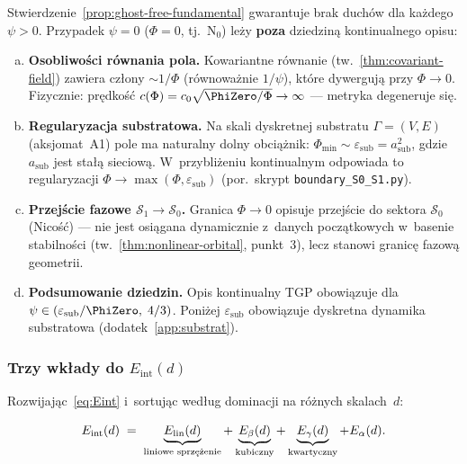 \begin{remark}%
\label{rem:Phi-zero-substrate}
Stwierdzenie~\ref{prop:ghost-free-fundamental} gwarantuje brak
duch\'ow dla ka\.zdego $\psi > 0$. Przypadek $\psi = 0$
($\Phi = 0$, tj.~$\mathrm{N}_0$) le\.zy \textbf{poza}
dziedzin\k{a} kontinualnego opisu:

\begin{enumerate}[(a)]
  \item \textbf{Osobliwo\'sci r\'ownania pola.}
    Kowariantne r\'ownanie (tw.~\ref{thm:covariant-field})
    zawiera cz\l{}ony $\sim 1/\Phi$ (r\'ownowa\.znie
    $1/\psi$), kt\'ore dywerguj\k{a} przy $\Phi \to 0$.
    Fizycznie: pr\k{e}dko\'s\'c $c(\Phi) = c_0\sqrt{\PhiZero/\Phi}
    \to \infty$ --- metryka degeneruje si\k{e}.
  \item \textbf{Regularyzacja substratowa.}
    Na skali dyskretnej substratu $\Gamma = (V, E)$ (aksjomat~A1)
    pole ma naturalny dolny obci\k{a}\.znik:
    $\Phi_{\min} \sim \varepsilon_{\mathrm{sub}}
    = a_{\mathrm{sub}}^2$,
    gdzie $a_{\mathrm{sub}}$ jest sta\l{}\k{a} sieciow\k{a}.
    W~przybli\.zeniu kontinualnym odpowiada to
    regularyzacji $\Phi \to \max(\Phi, \varepsilon_{\mathrm{sub}})$
    (por.\ skrypt \texttt{boundary\_S0\_S1.py}).
  \item \textbf{Przej\'scie fazowe $\mathcal{S}_1 \to \mathcal{S}_0$.}
    Granica $\Phi \to 0$ opisuje przej\'scie do sektora $\mathcal{S}_0$
    (Nico\'s\'c) --- nie jest osi\k{a}gana dynamicznie
    z~danych pocz\k{a}tkowych w~basenie stabilno\'sci
    (tw.~\ref{thm:nonlinear-orbital}, punkt~3),
    lecz stanowi granic\k{e} fazow\k{a} geometrii.
  \item \textbf{Podsumowanie dziedzin.}
    Opis kontinualny TGP obowi\k{a}zuje dla
    $\psi \in (\varepsilon_{\mathrm{sub}}/\PhiZero, \; 4/3)$.
    Poni\.zej $\varepsilon_{\mathrm{sub}}$ obowi\k{a}zuje
    dyskretna dynamika substratowa
    (dodatek~\ref{app:substrat}).
\end{enumerate}
\end{remark}

\subsubsection{Trzy wk\l{}ady do $E_{\mathrm{int}}(d)$}

Rozwijaj\k{a}c~\eqref{eq:Eint} i~sortuj\k{a}c wed\l{}ug dominacji
na r\'o\.znych skalach~$d$:

\begin{equation}\label{eq:Eint-decomp}
  E_{\mathrm{int}}(d) \;=\;
    \underbrace{E_{\mathrm{lin}}(d)}_{\text{liniowe sprz\k{e}\.zenie}}
  + \underbrace{E_{\beta}(d)}_{\text{kubiczny}}
  + \underbrace{E_{\gamma}(d)}_{\text{kwartyczny}}
  + E_{\alpha}(d).
\end{equation}

